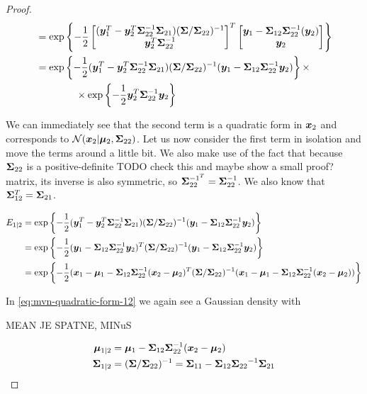 \begin{proof}
\begin{align}
        &= \exp \left\lbrace -\frac{1}{2}
        \begin{bmatrix} ({\bm{y}}_1^T - {\bm{y}}_2^T {\bm{\Sigma}}_{22}^{-1} {\bm{\Sigma}}_{21}) ({\bm{\Sigma}}/{\bm{\Sigma}}_{22})^{-1} \\
        {\bm{y}}_2^T {\bm{\Sigma}}_{22}^{-1}
        \end{bmatrix}^T
        \begin{bmatrix} {\bm{y}}_1 -{\bm{\Sigma}}_{12} {\bm{\Sigma}}_{22}^{-1} ({\bm{y}}_2) \\ {\bm{y}}_2 \end{bmatrix}
        \right\rbrace \\
        &= \exp \left\lbrace -\frac{1}{2}
        ({\bm{y}}_1^T - {\bm{y}}_2^T {\bm{\Sigma}}_{22}^{-1} {\bm{\Sigma}}_{21}) ({\bm{\Sigma}}/{\bm{\Sigma}}_{22})^{-1} ({\bm{y}}_1 -{\bm{\Sigma}}_{12} {\bm{\Sigma}}_{22}^{-1} {\bm{y}}_2)
        \right\rbrace \times \\
        & \qquad\qquad \times \exp \left\lbrace -\frac{1}{2} {\bm{y}}_2^T {\bm{\Sigma}}_{22}^{-1} {\bm{y}}_2 \right\rbrace \nonumber
    \end{align}
    
    We can immediately see that the second term is a quadratic form in ${\bm{x}}_2$ and corresponds to ${\mathcal{N}}({\bm{x}}_2 | {\bm{\mu}}_2, {\bm{\Sigma}}_{22})$. Let us now consider the first term in isolation and move the terms around a little bit. We also make use of the fact that because ${\bm{\Sigma}}_{22}$ is a positive-definite {TODO check this and maybe show a small proof?} matrix, its inverse is also symmetric, so ${\bm{\Sigma}}^{-1^T}_{22} = {\bm{\Sigma}}^{-1}_{22}$. We also know that ${\bm{\Sigma}}^T_{12} = {\bm{\Sigma}}_{21}$.
    
    \begin{align}
        E_{1|2} &= \exp \left\lbrace -\frac{1}{2}
        ({\bm{y}}_1^T - {\bm{y}}_2^T {\bm{\Sigma}}_{22}^{-1} {\bm{\Sigma}}_{21}) ({\bm{\Sigma}}/{\bm{\Sigma}}_{22})^{-1} ({\bm{y}}_1 -{\bm{\Sigma}}_{12} {\bm{\Sigma}}_{22}^{-1} {\bm{y}}_2) \right\rbrace \\
        &= \exp \left\lbrace -\frac{1}{2}
        ({\bm{y}}_1 - {\bm{\Sigma}}_{12}{\bm{\Sigma}}_{22}^{-1} {\bm{y}}_2)^T ({\bm{\Sigma}}/{\bm{\Sigma}}_{22})^{-1} ({\bm{y}}_1 -{\bm{\Sigma}}_{12} {\bm{\Sigma}}_{22}^{-1} {\bm{y}}_2) \right\rbrace \\
        &= \exp \left\lbrace -\frac{1}{2}
        ({\bm{x}}_1 - {\bm{\mu}}_1 - {\bm{\Sigma}}_{12}{\bm{\Sigma}}_{22}^{-1} ({\bm{x}}_2 - {\bm{\mu}}_2)^T ({\bm{\Sigma}}/{\bm{\Sigma}}_{22})^{-1} ({\bm{x}}_1 - {\bm{\mu}}_1 -{\bm{\Sigma}}_{12} {\bm{\Sigma}}_{22}^{-1} ({\bm{x}}_2 - {\bm{\mu}}_2)) \right\rbrace \label{eq:mvn-quadratic-form-12}
    \end{align}
    
    In \eqref{eq:mvn-quadratic-form-12} we again see a Gaussian density with
    
    MEAN JE SPATNE, MINuS
    
    \begin{align}
        {\bm{\mu}}_{1|2} &= {\bm{\mu}}_1 - {\bm{\Sigma}}_{12}{\bm{\Sigma}}_{22}^{-1} ({\bm{x}}_2 - {\bm{\mu}}_2) \\
        {\bm{\Sigma}}_{1|2} &= ({\bm{\Sigma}}/{\bm{\Sigma}}_{22})^{-1} =  {{\bm{\Sigma}}_{11}} - {{\bm{\Sigma}}_{12}} {{\bm{\Sigma}}_{22}}^{-1} {{\bm{\Sigma}}_{21}}
    \end{align}
\end{proof}



